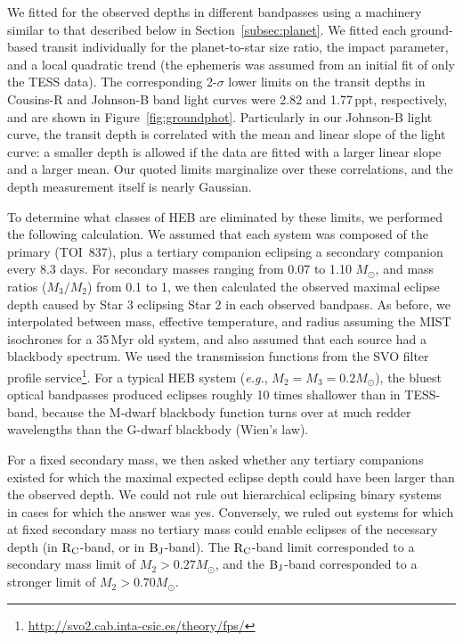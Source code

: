 \documentclass[12pt,twocolumn,tighten]{aastex63}
\newcommand{\tn}{TOI~837} %
\begin{document}
We fitted for the observed depths in different bandpasses using a
machinery similar to that described below in
Section~\ref{subsec:planet}.  We fitted each ground-based transit
individually for the planet-to-star size ratio, the impact parameter,
and a local quadratic trend (the ephemeris was assumed from an initial
fit of only the TESS data).  The corresponding 2-$\sigma$ lower limits
on the transit depths in Cousins-R and Johnson-B band light curves
were 2.82 and 1.77$\,$ppt, respectively, and are shown in
Figure~\ref{fig:groundphot}.  Particularly in our Johnson-B light
curve, the transit depth is correlated with the mean and linear slope
of the light curve: a smaller depth is allowed if the data are fitted
with a larger linear slope and a larger mean.  Our quoted limits
marginalize over these correlations, and the depth measurement itself
is nearly Gaussian.

To determine what classes of HEB are eliminated by these limits, we
performed the following calculation.  We assumed that each system was
composed of the primary (\tn), plus a tertiary companion eclipsing a
secondary companion every 8.3 days.  For secondary masses ranging from
0.07 to 1.10 $M_\odot$, and mass ratios ($M_3/M_2$) from 0.1 to 1, we
then calculated the observed maximal eclipse depth caused by Star 3
eclipsing Star 2 in each observed bandpass.  As before, we
interpolated between mass, effective temperature, and radius assuming
the MIST isochrones for a 35$\,$Myr old system, and also assumed that
each source had a blackbody spectrum.  We used the transmission
functions from the SVO filter profile
service\footnote{\url{http://svo2.cab.inta-csic.es/theory/fps/}}.  For
a typical HEB system ({\it e.g.}, $M_2=M_3=0.2M_\odot$), the bluest
optical bandpasses produced eclipses roughly 10 times shallower than
in TESS-band, because the M-dwarf blackbody function turns over at
much redder wavelengths than the G-dwarf blackbody (Wien's law).

For a fixed secondary mass, we then asked whether any tertiary
companions existed for which the maximal expected eclipse depth could
have been larger than the observed depth.  We could not rule out
hierarchical eclipsing binary systems in cases for which the answer
was yes.  Conversely, we ruled out systems for which at fixed
secondary mass no tertiary mass could enable eclipses of the necessary
depth (in ${\rm R_C}$-band, or in ${\rm B_J}$-band).  The ${\rm
R_C}$-band limit corresponded to a secondary mass limit of $M_2 > 0.27
M_\odot$, and the ${\rm B_J}$-band corresponded to a stronger limit of
$M_2 > 0.70 M_\odot$.
\end{document}
